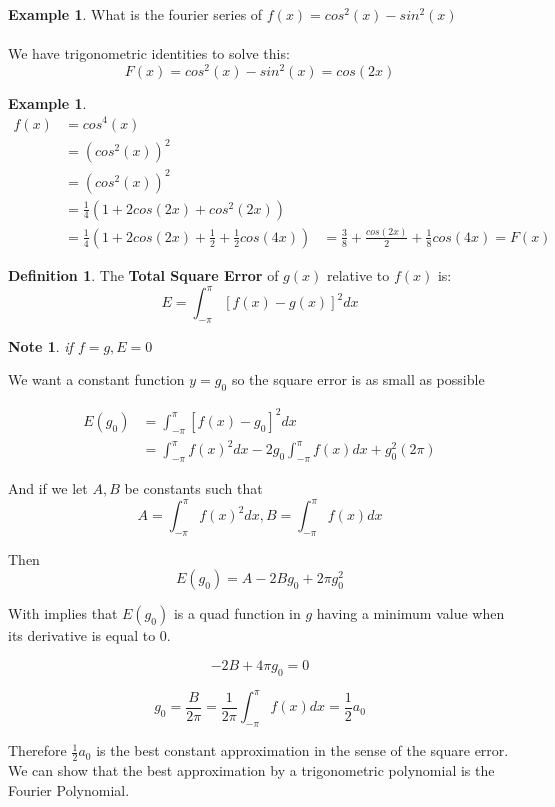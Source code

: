 \documentclass[12pt]{article}
\theoremstyle{plain}
\newtheorem*{note}{Note}
\theoremstyle{definition}
\newtheorem{definition}[theorem]{Definition}
\newtheorem{example}[theorem]{Example}
\begin{document}
\begin{example}
	What is the fourier series of $f(x)=cos^2(x) - sin^2(x)$\\
	\\
	We have trigonometric identities to solve this:
	$$F(x)=cos^2(x) - sin^2(x)=cos(2x)$$
\end{example}

\begin{example}
	\begin{align*}
	f(x) &=cos^4(x)\\
	&=(cos^2(x))^2\\
	&=(cos^2(x))^2\\
	&= \frac{1}{4}(1+2cos(2x) + cos^2 (2x))\\
	&= \frac{1}{4}(1 + 2cos(2x) + \frac{1}{2} + \frac{1}{2}cos(4x))
	&= \frac{3}{8} + \frac{cos(2x)}{2} + \frac{1}{8}cos(4x) = F(x)
	\end{align*}
\end{example}

\begin{definition}
	The \textbf{Total Square Error} of $g(x)$ relative to $f(x)$ is:
	$$E = \int^\pi_{-\pi} [f(x) - g(x)]^2 dx$$
\end{definition}

\begin{note}
	if $f=g, E=0$
\end{note}

We want a constant function $y=g_0$ so the square error is as small as possible

\begin{align*}
	E(g_0) &= \int^\pi_{-\pi} [f(x) - g_0]^2 dx\\
	&= \int^\pi_{-\pi} f(x)^2 dx - 2 g_0 \int^\pi_{-\pi} f(x) dx + g_0^2 (2\pi)
\end{align*}

And if we let $A,B$ be constants such that $$A = \int^\pi_{-\pi} f(x)^2 dx, B = \int^\pi_{-\pi} f(x) dx$$

Then
$$E(g_0) = A - 2 B g_0 + 2 \pi g_0^2$$

With implies that $E(g_0)$ is a quad function in $g$ having a minimum value when its derivative is equal to 0.

$$-2B + 4\pi g_0 = 0$$

$$g_0 = \frac{B}{2\pi} = \frac{1}{2\pi} \int^\pi_{-\pi} f(x) dx = \frac{1}{2} a_0$$

Therefore $\frac{1}{2} a_0$ is the best constant approximation in the sense of the square error. We can show that the best approximation by a trigonometric polynomial is the Fourier Polynomial.
\end{document}
